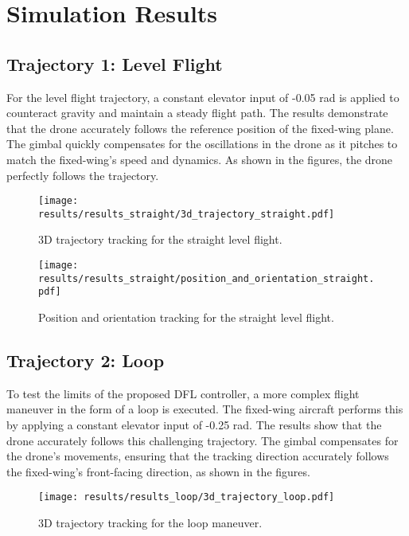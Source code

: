 \documentclass{article}
\begin{document}
\section{Simulation Results}

\subsection{Trajectory 1: Level Flight}
For the level flight trajectory, a constant elevator input of -0.05 rad is applied to counteract gravity and maintain a steady flight path. The results demonstrate that the drone accurately follows the reference position of the fixed-wing plane. The gimbal quickly compensates for the oscillations in the drone as it pitches to match the fixed-wing's speed and dynamics. As shown in the figures, the drone perfectly follows the trajectory.

\begin{figure}[h!]
    \centering
    \texttt{[image: results/results\_straight/3d\_trajectory\_straight.pdf]}
    \caption{3D trajectory tracking for the straight level flight.}
    \label{fig:straight_3d_traj}
\end{figure}

\begin{figure}[h!]
    \centering
    \texttt{[image: results/results\_straight/position\_and\_orientation\_straight.pdf]}
    \caption{Position and orientation tracking for the straight level flight.}
    \label{fig:straight_pos_orient}
\end{figure}

\clearpage

\subsection{Trajectory 2: Loop}
To test the limits of the proposed DFL controller, a more complex flight maneuver in the form of a loop is executed. The fixed-wing aircraft performs this by applying a constant elevator input of -0.25 rad. The results show that the drone accurately follows this challenging trajectory. The gimbal compensates for the drone's movements, ensuring that the tracking direction accurately follows the fixed-wing's front-facing direction, as shown in the figures.

\begin{figure}[h!]
    \centering
    \texttt{[image: results/results\_loop/3d\_trajectory\_loop.pdf]}
    \caption{3D trajectory tracking for the loop maneuver.}
    \label{fig:loop_3d_traj}
\end{figure}
\end{document}
